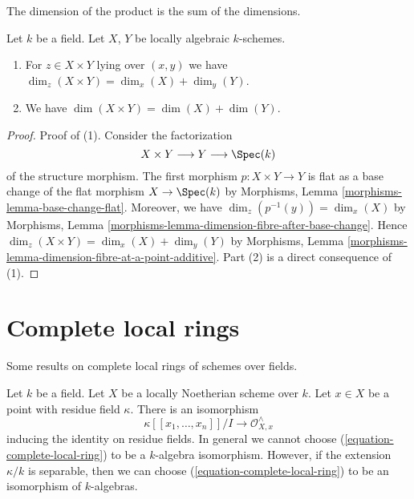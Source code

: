 \begin{lemma}
\label{lemma-dimension-product-locally-algebraic}
\begin{slogan}
The dimension of the product is the sum of the dimensions.
\end{slogan}
Let $k$ be a field. Let $X$, $Y$ be locally algebraic $k$-schemes.
\begin{enumerate}
\item For $z \in X \times Y$ lying over $(x, y)$ we have
$\dim_z(X \times Y) = \dim_x(X) + \dim_y(Y)$.
\item We have $\dim(X \times Y) = \dim(X) + \dim(Y)$.
\end{enumerate}
\end{lemma}

\begin{proof}
Proof of (1). Consider the factorization
$$
X \times Y \longrightarrow Y \longrightarrow \Spec(k)
$$
of the structure morphism. The first morphism $p : X \times Y \to Y$
is flat as a base change of the flat morphism $X \to \Spec(k)$
by Morphisms, Lemma \ref{morphisms-lemma-base-change-flat}.
Moreover, we have $\dim_z(p^{-1}(y)) = \dim_x(X)$ by
Morphisms, Lemma \ref{morphisms-lemma-dimension-fibre-after-base-change}.
Hence $\dim_z(X \times Y) = \dim_x(X) + \dim_y(Y)$ by
Morphisms, Lemma \ref{morphisms-lemma-dimension-fibre-at-a-point-additive}.
Part (2) is a direct consequence of (1).
\end{proof}






\section{Complete local rings}
\label{section-complete-local-rings}

\noindent
Some results on complete local rings of schemes over fields.

\begin{lemma}
\label{lemma-complete-local-ring-structure-as-algebra}
Let $k$ be a field. Let $X$ be a locally Noetherian scheme over $k$.
Let $x \in X$ be a point with residue field $\kappa$.
There is an isomorphism
\begin{equation}
\label{equation-complete-local-ring}
\kappa[[x_1, \ldots, x_n]]/I \longrightarrow \mathcal{O}_{X, x}^\wedge
\end{equation}
inducing the identity on residue fields.
In general we cannot choose (\ref{equation-complete-local-ring})
to be a $k$-algebra isomorphism. However, if the extension $\kappa/k$
is separable, then we can choose
(\ref{equation-complete-local-ring}) to be an isomorphism of $k$-algebras.
\end{lemma}

